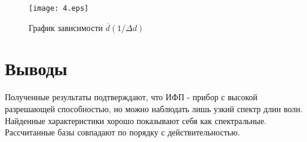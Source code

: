 \documentclass[12pt,a4paper]{extreport}
\begin{document}
\begin{figure}[!h]
	\centering
	\texttt{[image: 4.eps]}
	\caption{График зависимости $\overline{d}(1/\Delta d)$}
	\label{fig:screenshot7}
\end{figure}


\section{Выводы}
Полученные результаты подтверждают, что ИФП - прибор с высокой разрешающей способностью, но можно наблюдать лишь узкий спектр длин волн.
Найденные характеристики хорошо показывают себя как спектральные.
Рассчитанные базы совпадают по порядку с действительностью.
\end{document}
